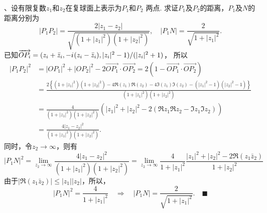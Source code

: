 \vspace{1cm}
\par{}、设有限复数$z_1$和$z_2$在复球面上表示为$P_1$和$P_2$
  两点. 求证$P_1$及$P_2$的距离，$P_1$及$N$的距离分别为
  \[
    |P_1P_2| = \frac{2|z_1-z_2|}{\sqrt{(1+|z_1|^2)(1+|z_2|^2)}},\quad
    |P_1N| = \frac{2}{\sqrt{1+|z_1|^2}}.
  \]
\proof
  已知$\overrightarrow{OP_i} = (z_i+\bar{z}_i,-{i\mkern1mu}(z_i-\bar{z}_i),|z_i|^2-1)/(|z_i|^2+1)$，
  所以
  \[\begin{split}
    |P_1P_2|^2 &= |OP_1|^2+|OP_2|^2 - 2\overrightarrow{OP_1}\cdot\overrightarrow{OP_2}
                = 2(1-\overrightarrow{OP_1}\cdot\overrightarrow{OP_2})\\
              &= \frac{2\left\{
                (1+|z_1|^2)(1+|z_2|^2) - 4\Re(z_1)\Re(z_2) - 4\Im(z_1)\Im(z_2)
                - (|z_1|^2-1)(|z_2|^2-1)\right\}}{(1+|z_1|^2)(1+|z_2|^2)}\\
              &= \frac{4}{(1+|z_1|^2)(1+|z_2|^2)}(|z_1|^2+|z_2|^2
                -2(\Re z_1\Re z_2 - \Im z_1\Im z_2)) \\
              &= \frac{4|z_1-z_2|^2}{(1+|z_1|^2)(1+|z_2|^2)}.
  \end{split}\]
  同时，令$z_2\to\infty$，则有
  \[
    |P_1N|^2 = \lim_{z_2\to\infty} \frac{4|z_1-z_2|^2}{(1+|z_1|^2)(1+|z_2|^2)}
    = \lim_{z_2\to\infty}\frac{4}{1+|z_1|^2}
      \frac{|z_1|^2+|z_2|^2-2\Re(z_1\bar{z}_2)}{1+|z_2|^2}
  \]
  由于$|\Re(z_1\bar{z}_2)| \le |z_1||z_2|$，所以，
  \[
    |P_1N|^2 = \frac{4}{1+|z_1|^2} \quad\Rightarrow\quad
    |P_1N| = \frac{2}{\sqrt{1+|z_1|^2}}.\quad\blacksquare
  \]



